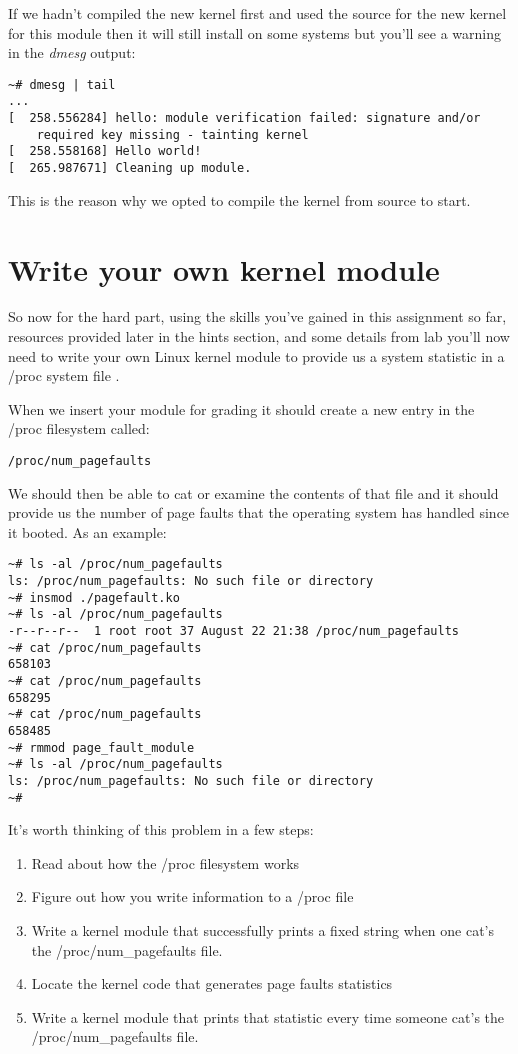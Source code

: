 \documentclass[11pt]{article}
\begin{document}
If we hadn't compiled the new kernel first and used the source for the new kernel for this module then it will still install on some systems but you'll see a warning in the {\it dmesg} output:

\begin{verbatim}
~# dmesg | tail
...
[  258.556284] hello: module verification failed: signature and/or  
	required key missing - tainting kernel
[  258.558168] Hello world!
[  265.987671] Cleaning up module.
\end{verbatim}

This is the reason why we opted to compile the kernel from source to start. 

\section*{Write your own kernel module}

So now for the hard part, using the skills you've gained in this assignment so far, resources provided later in the hints section, and some details from lab you'll now need to write your own Linux kernel module to provide us a system statistic in a /proc system file \cite{cse551}. 

When we insert your module for grading it should create a new entry in the /proc filesystem called:

\begin{verbatim}
/proc/num_pagefaults
\end{verbatim}

\newpage

We should then be able to cat or examine the contents of that file and it should provide us the number of page faults that the operating system has handled since it booted. As an example:

\begin{verbatim}
~# ls -al /proc/num_pagefaults
ls: /proc/num_pagefaults: No such file or directory
~# insmod ./pagefault.ko 
~# ls -al /proc/num_pagefaults
-r--r--r--  1 root root 37 August 22 21:38 /proc/num_pagefaults
~# cat /proc/num_pagefaults 
658103
~# cat /proc/num_pagefaults 
658295
~# cat /proc/num_pagefaults 
658485
~# rmmod page_fault_module
~# ls -al /proc/num_pagefaults
ls: /proc/num_pagefaults: No such file or directory
~#
\end{verbatim}

It's worth thinking of this problem in a few steps:

\begin{enumerate}
\item Read about how the /proc filesystem works
\item Figure out how you write information to a /proc file
\item Write a kernel module that successfully prints a fixed string when one cat's the /proc/num\_pagefaults file. 
\item Locate the kernel code that generates page faults statistics
\item Write a kernel module that prints that statistic every time someone cat's the /proc/num\_pagefaults file.
\end{enumerate}
\end{document}
